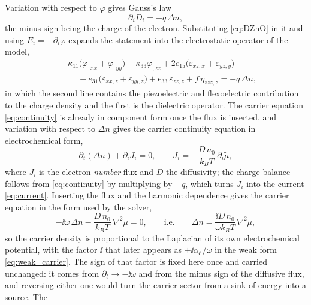 Variation with respect to $\varphi$ gives Gauss's law
\begin{equation}
\label{eq:gauss}
\partial_iD_i=-q\,\Delta n,
\end{equation}
the minus sign being the charge of the electron.  Substituting
\eqref{eq:DZnO} in it and using $E_i=-\partial_i\varphi$ expands the statement
into the electrostatic operator of the model,
\begin{equation}
\label{eq:gauss_expanded}
\begin{aligned}
&-\kappa_{11}\bigl(\varphi_{,xx}+\varphi_{,yy}\bigr)
-\kappa_{33}\varphi_{,zz}
+2e_{15}\bigl(\varepsilon_{xz,x}+\varepsilon_{yz,y}\bigr)\\
&\qquad
+e_{31}\bigl(\varepsilon_{xx,z}+\varepsilon_{yy,z}\bigr)
+e_{33}\,\varepsilon_{zz,z}
+f\,\eta_{zzz,z}
=-q\,\Delta n ,
\end{aligned}
\end{equation}
in which the second line contains the piezoelectric and flexoelectric
contribution to the charge density and the first is the dielectric operator.  The
carrier equation \eqref{eq:continuity} is already in component form once the flux
is inserted, and variation with respect to $\Delta n$ gives the carrier
continuity equation in electrochemical form,
\begin{equation}
\label{eq:continuity}
\partial_t(\Delta n)+\partial_iJ_i=0,
\qquad
J_i=-\frac{D\,n_0}{k_BT}\,\partial_i\widetilde\mu ,
\end{equation}
where $J_i$ is the electron \emph{number} flux and $D$ the diffusivity; the
charge balance follows from \eqref{eq:continuity} by multiplying by $-q$, which
turns $J_i$ into the current \eqref{eq:current}.  Inserting the flux and the
harmonic dependence gives the carrier equation in the form used by the solver,
\begin{equation}
\label{eq:carrier_strong}
-\ii\omega\,\Delta n-\frac{D\,n_0}{k_BT}\,\nabla^{2}\widetilde\mu=0 ,
\qquad\text{i.e.}\qquad
\Delta n=\frac{\ii D\,n_0}{\omega k_BT}\,\nabla^{2}\widetilde\mu ,
\end{equation}
so the carrier density is proportional to the Laplacian of its own
electrochemical potential, with the factor $\ii$ that later appears as
$+\ii\alpha_{\mathrm d}/\omega$ in the weak form \eqref{eq:weak_carrier}.  The
sign of that factor is fixed here once and carried unchanged: it comes from
$\partial_t\to-\ii\omega$ and from the minus sign of the diffusive flux, and
reversing either one would turn the carrier sector from a sink of energy into a
source.  The
